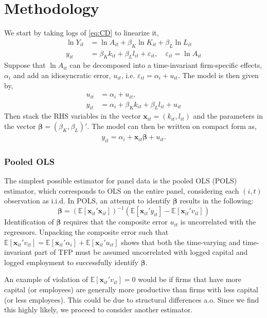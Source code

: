\section{Methodology} \label{sec:methodology}

We start by taking logs of \eqref{eq:CD} to linearize it,
\begin{align*}
    \ln Y_{it} &= \ln A_{it} + \beta_K \ln K_{it} + \beta_L \ln L_{it} \\
    y_{it} &= \beta_K k_{it} + \beta_L l_{it} + \varepsilon_{it}, \quad \varepsilon_{it} = \ln A_{it}
\end{align*}
Suppose that $\ln A_{it}$ can be decomposed into a time-invariant firm-specific effects, $\alpha_i$ and add an idiosyncratic error, $u_{it}$, i.e. $\varepsilon_{it} = \alpha_i + u_{it}$. The model is then given by,
\begin{align*}
    u_{it} &= \alpha_i + u_{it}, \\
    y_{it} &= \alpha_i + \beta_K k_{it} + \beta_L l_{it} + u_{it}
\end{align*}
Then stack the RHS variables in the vector $\bm{x}_{it} = (k_{it}, l_{it})$ and the parameters in the vector $\bm{\beta} = (\beta_K, \beta_L)'$. The model can then be written on compact form as,
\begin{align}
    y_{it} = \alpha_i + \bm{x}_{it} \bm{\beta} + u_{it}.
    \label{equationline}
\end{align}

\subsubsection*{Pooled OLS}
The simplest possible estimator for panel data is the pooled OLS (POLS) estimator, which corresponds to OLS on the entire panel, considering each $(i,t)$ observation as i.i.d. In POLS, an attempt to identify $\pmb{\beta}$ results in the following:
$$\pmb{\beta} = (\mathbb{E}[\pmb{x}_{it}'\pmb{x}_{it}])^{-1} \left(  \mathbb{E}[\pmb{x}_{it}'y_{it}]-\mathbb{E}[\pmb{x}_{it}' v_{it}]\right)$$
Identification of $\pmb{\beta}$ requires that the composite error $u_{it}$ is uncorrelated with the regressors. Unpacking the composite error  such that $\mathbb{E}[\pmb{x}_{it}'v_{it}]=\mathbb{E}[\pmb{x}_{it}'\alpha_{i}]+\mathbb{E}[\pmb{x}_{it}'u_{it}]$ shows that both the time-varying and time-invariant part of TFP must be assumed uncorrelated with logged capital and logged employment to successfully identify $\pmb{\beta}$.

An example of violation of $\mathbb{E}[\pmb{x}_{it}'v_{it}]=0$ would be if firms that have more capital (or employees) are generally more productive than firms with less capital (or less employees). This could be due to structural differences a.o. Since we find this highly likely, we proceed to consider another estimator.

